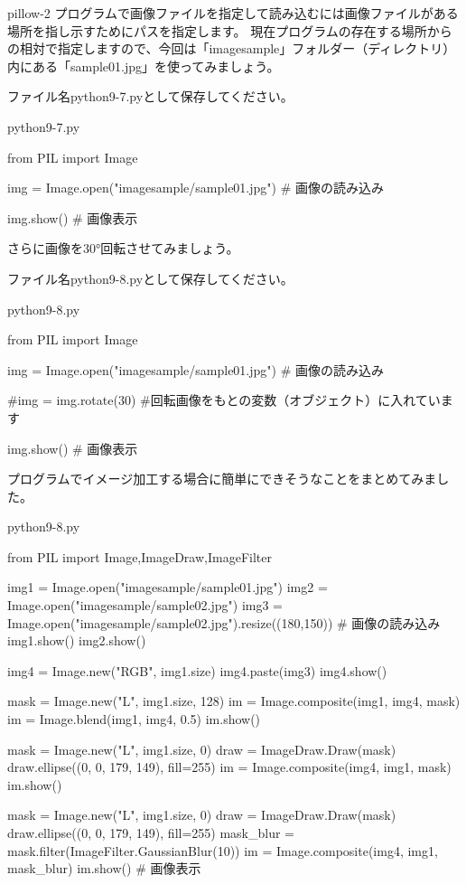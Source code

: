 \documentclass[11pt,a4paper,dvipdfmx,titlepage]{jsreport}
\begin{document}
\begin{pabox}{pillow-2}
プログラムで画像ファイルを指定して読み込むには画像ファイルがある場所を指し示すためにパスを指定します。
現在プログラムの存在する場所からの相対で指定しますので、今回は「imagesample」フォルダー（ディレクトリ）内にある「sample01.jpg」を使ってみましょう。

ファイル名python9-7.pyとして保存してください。
\begin{codebox}{python9-7.py}
\begin{listing}{1}
from PIL import Image

img = Image.open("imagesample/sample01.jpg")  
# 画像の読み込み

img.show()  # 画像表示

\end{listing}
\end{codebox}

さらに画像を30°回転させてみましょう。

ファイル名python9-8.pyとして保存してください。
\begin{codebox}{python9-8.py}
\begin{listing}{1}
from PIL import Image

img = Image.open("imagesample/sample01.jpg")  
# 画像の読み込み

#img = img.rotate(30)
#回転画像をもとの変数（オブジェクト）に入れています

img.show()  # 画像表示

\end{listing}
\end{codebox}


プログラムでイメージ加工する場合に簡単にできそうなことをまとめてみました。

\begin{codebox}{python9-8.py}
\begin{listing}{1}
from PIL import Image,ImageDraw,ImageFilter

img1 = Image.open("imagesample/sample01.jpg") 
img2 = Image.open("imagesample/sample02.jpg") 
img3 = Image.open("imagesample/sample02.jpg").resize((180,150))
# 画像の読み込み
img1.show()  
img2.show()

img4 = Image.new("RGB", img1.size)
img4.paste(img3)
img4.show()

mask = Image.new("L", img1.size, 128)
im = Image.composite(img1, img4, mask)
im = Image.blend(img1, img4, 0.5)
im.show()

mask = Image.new("L", img1.size, 0)
draw = ImageDraw.Draw(mask)
draw.ellipse((0, 0, 179, 149), fill=255)
im = Image.composite(img4, img1, mask)
im.show()

mask = Image.new("L", img1.size, 0)
draw = ImageDraw.Draw(mask)
draw.ellipse((0, 0, 179, 149), fill=255)
mask_blur = mask.filter(ImageFilter.GaussianBlur(10))
im = Image.composite(img4, img1, mask_blur)
im.show()
# 画像表示
\end{listing}
\end{codebox}
\end{pabox}
\end{document}

